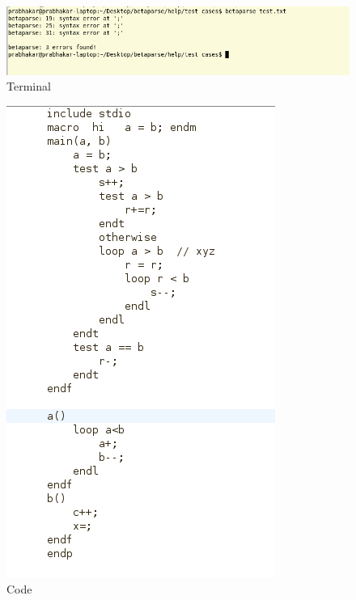 \documentclass[12pt, oneside, a4paper]{article}
\begin{document}
\begin{figure}[htb]
\begin{center}
\ifpdf
	\includegraphics[scale=0.50]{example1.png}
\else
\fi
\caption{Terminal}
\end{center}
\end{figure}
\newpage
\begin{figure}[htb]
\begin{center}
\ifpdf
	\includegraphics[scale=0.70]{example.png}
\else
\fi
\caption{Code}
\end{center}
\end{figure}
\end{document}
